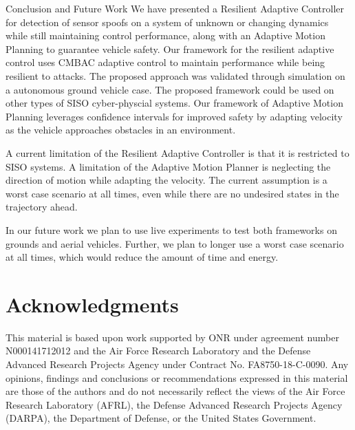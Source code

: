 
\begin{section}{Conclusion and Future Work} \label{sec:conclusion}
We have presented a Resilient Adaptive Controller for detection of sensor spoofs on a system of unknown or changing dynamics while still maintaining control performance, along with an Adaptive Motion Planning to guarantee vehicle safety. Our framework for the resilient adaptive control uses CMBAC adaptive control to maintain performance while being resilient to attacks. The proposed approach was validated through simulation on a autonomous ground vehicle case. The proposed framework could be used on other types of SISO cyber-physcial systems. Our framework of Adaptive Motion Planning leverages confidence intervals for improved safety by adapting velocity as the vehicle approaches obstacles in an environment.

A current limitation of the Resilient Adaptive Controller is that it is restricted to SISO systems. A limitation of the Adaptive Motion Planner is neglecting the direction of motion while adapting the velocity. The current assumption is a worst case scenario at all times, even while there are no undesired states in the trajectory ahead.

In our future work we plan to use live experiments to test both frameworks on grounds and aerial vehicles. Further, we plan to longer use a worst case scenario at all times, which would reduce the amount of time and energy.

\end{section}

\section*{Acknowledgments} 
This material is based upon work supported by ONR under agreement number N000141712012 and 
the Air Force Research Laboratory and the Defense Advanced Research Projects Agency under Contract No. FA8750-18-C-0090. Any opinions, findings and conclusions or recommendations expressed in this material are those of the authors and do not necessarily reflect the views of the Air Force Research Laboratory (AFRL), the Defense Advanced Research Projects Agency (DARPA), the Department of Defense, or the United States Government. 




